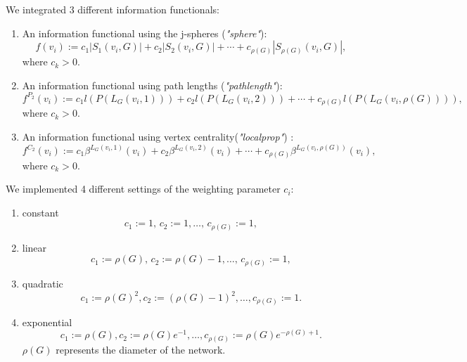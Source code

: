 \documentclass[a4paper]{article}
\begin{document}
We integrated 3 different information functionals:

\begin{enumerate}
\item An information functional using the j-spheres (\textit{"sphere"}):
\begin{equation}
\label{eq:spherfunct}
f(v_i):= c_1|S_1(v_i,G)| + c_2|S_2(v_i,G)| + \cdots + c_{\rho(G)}|S_{\rho(G)}(v_i,G)|,
\end{equation}
where $ c_k > 0$.

\item An information functional using path lengths (\textit{"pathlength"}):
\begin{equation}
  f^{P_2}(v_i) := c_1l(P(L_G(v_i,1))) + c_2l(P(L_G(v_i,2))) + \cdots + c_{\rho(G)}l(P(L_G(v_i,\rho(G)))),
\end{equation}
where $ c_k > 0$.
\item An information functional using vertex centrality(\textit{"localprop"}) :
\begin{equation} 
  f^{C_2}(v_i) := c_1\beta^{L_G(v_i,1)}(v_i) + c_2\beta^{L_G(v_i,2)}(v_i) + \cdots + c_{\rho(G)}\beta^{L_G(v_i,\rho(G))}(v_i),
\end{equation}
where $ c_k > 0$.
\end{enumerate}



We implemented 4 different settings of the weighting parameter $c_i$:

\begin{enumerate}
\item constant
\begin{equation}
\label{eq:lin}
c_1:= 1,\, c_2:=  1, \ldots, \, c_{\rho(G)}:= 1,
\end{equation}

\item linear
\begin{equation}
\label{eq:lin}
c_1:= \rho(G),\, c_2:= \rho(G)-1, \ldots, \, c_{\rho(G)}:= 1,
\end{equation}

\item quadratic
\begin{equation}
\label{eq:exp}
c_{1}:= \rho(G)^2, c_{2}:= (\rho(G)-1)^2, \ldots, c_{\rho(G)}:= 1.
\end{equation}
\item exponential
\begin{equation}
\label{eq:exp}
c_{1}:= \rho(G), c_{2}:= \rho(G)e^{-1}, \ldots, c_{\rho(G)}:= \rho(G)e^{-\rho(G) + 1}.
\end{equation}
$\rho(G)$ represents the diameter of the network.

\end{enumerate}
\end{document}
